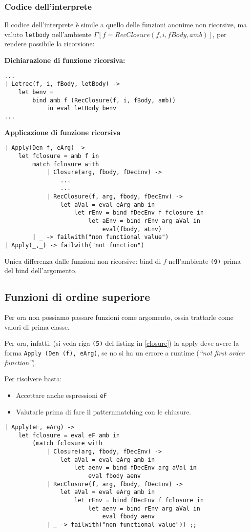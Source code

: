 \documentclass[a4paper,10pt]{article}
\begin{document}
\subsubsection{Codice dell'interprete}
Il codice dell'interprete è simile a quello delle funzioni anonime non ricorsive, ma valuto \texttt{letbody} nell'ambiente $\Gamma[f = RecClosure(f, i, fBody, amb)]$, per rendere possibile la ricorsione:\smallskip

\textbf{Dichiarazione di funzione ricorsiva:}
\begin{lstlisting}
...
| Letrec(f, i, fBody, letBody) ->
    let benv =
        bind amb f (RecClosure(f, i, fBody, amb))
            in eval letBody benv
...
\end{lstlisting}

\newpage
\textbf{Applicazione di funzione ricorsiva}

\begin{lstlisting}
| Apply(Den f, eArg) ->
    let fclosure = amb f in
        match fclosure with
            | Closure(arg, fbody, fDecEnv) ->
                ...
                ...
            | RecClosure(f, arg, fbody, fDecEnv) ->
                let aVal = eval eArg amb in
                    let rEnv = bind fDecEnv f fclosure in
                        let aEnv = bind rEnv arg aVal in
                            eval(fbody, aEnv)
        | _ -> failwith("non functional value")
| Apply(_,_) -> failwith("not function")
\end{lstlisting}

Unica differenza dalle funzioni non ricorsive: bind di $f$ nell'ambiente \texttt{(9)} prima del bind dell'argomento.

\subsection{Funzioni di ordine superiore}
Per ora non possiamo passare funzioni come argomento, ossia trattarle come valori di prima classe.\smallskip

Per ora, infatti, (si veda riga \texttt{(5)} del listing in \ref{closure}) la apply deve avere la forma \texttt{Apply (Den (f), eArg)}, se no si ha un errore a runtime (\emph{``not first order function''}). \medskip

Per risolvere basta:
\begin{itemize}
 \item Accettare anche espressioni \texttt{eF} 
 \item Valutarle prima di fare il patternmatching con le chiusure.

\end{itemize}
\begin{lstlisting}
| Apply(eF, eArg) ->
    let fclosure = eval eF amb in
        (match fclosure with
            | Closure(arg, fbody, fDecEnv) ->
                let aVal = eval eArg amb in
                    let aenv = bind fDecEnv arg aVal in
                        eval fbody aenv
            | RecClosure(f, arg, fbody, fDecEnv) ->
                let aVal = eval eArg amb in
                    let rEnv = bind fDecEnv f fclosure in
                        let aenv = bind rEnv arg aVal in
                            eval fbody aenv
            | _ -> failwith("non functional value")) ;;
\end{lstlisting}
\newpage
\end{document}
